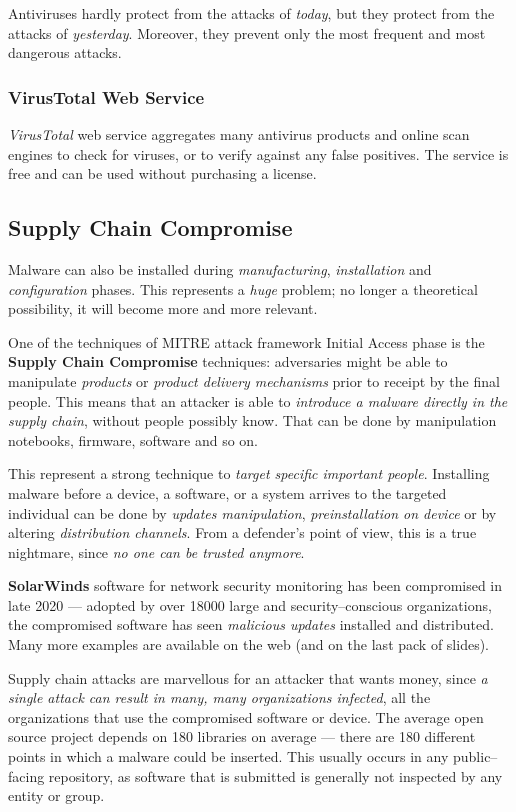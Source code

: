 \documentclass[10pt]{extreport}
\begin{document}
Antiviruses hardly protect from the attacks of \emph{today}, but they protect
from the attacks of \emph{yesterday}. Moreover, they prevent only the most
frequent and most dangerous attacks.

\subsubsection{VirusTotal Web Service}

\emph{VirusTotal} web service aggregates many antivirus products and online
scan engines to check for viruses, or to verify against any false positives.
The service is free and can be used without purchasing a license.

\subsection{Supply Chain Compromise}

Malware can also be installed during \emph{manufacturing}, \emph{installation}
and \emph{configuration} phases. This represents a \emph{huge} problem; no
longer a theoretical possibility, it will become more and more relevant.

One of the techniques of MITRE attack framework Initial Access phase is the
\textbf{Supply Chain Compromise} techniques: adversaries might be able to
manipulate \emph{products} or \emph{product delivery mechanisms} prior to
receipt by the final people. This means that an attacker is able to
\emph{introduce a malware directly in the supply chain}, without people
possibly know. That can be done by manipulation notebooks, firmware, software
and so on.

This represent a strong technique to \emph{target specific important people}.
Installing malware before a device, a software, or a system arrives to the
targeted individual can be done by \emph{updates manipulation},
\emph{preinstallation on device} or by altering \emph{distribution channels}.
From a defender's point of view, this is a true nightmare, since \emph{no one
can be trusted anymore}.

\textbf{SolarWinds} software for network security monitoring has been
compromised in late 2020 --- adopted by over 18000 large and security--conscious
organizations, the compromised software has seen \emph{malicious updates}
installed and distributed. Many more examples are available on the web (and on
the last pack of slides).

Supply chain attacks are marvellous for an attacker that wants money, since
\emph{a single attack can result in many, many organizations infected}, all the
organizations that use the compromised software or device. The average open
source project depends on 180 libraries on average --- there are 180 different
points in which a malware could be inserted. This usually occurs in any
public--facing repository, as software that is submitted is generally not
inspected by any entity or group.
\end{document}
